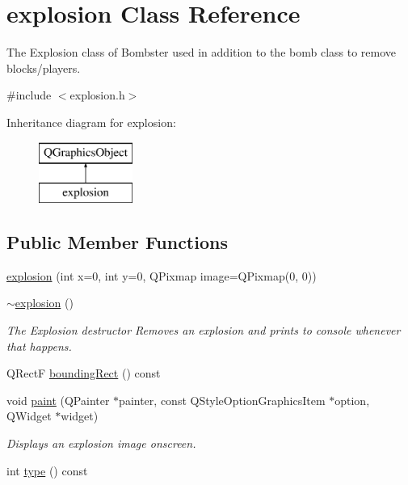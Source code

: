 \hypertarget{classexplosion}{\section{explosion Class Reference}
\label{classexplosion}
}


The Explosion class of Bombster used in addition to the bomb class to remove blocks/players.  




{\ttfamily \#include $<$explosion.\-h$>$}

Inheritance diagram for explosion\-:\begin{figure}[H]
\begin{center}
\leavevmode
\includegraphics[height=2.000000cm]{classexplosion}
\end{center}
\end{figure}
\subsection*{Public Member Functions}
\begin{DoxyCompactItemize}
\item 
\hyperlink{classexplosion_a792865d6d3230927b5a85c72c9867555}{explosion} (int x=0, int y=0, Q\-Pixmap image=Q\-Pixmap(0, 0))
\item 
\hyperlink{classexplosion_a3fc08d8c702d74ee3164825c975f8230}{$\sim$explosion} ()
\begin{DoxyCompactList}\small\item\em The Explosion destructor Removes an explosion and prints to console whenever that happens. \end{DoxyCompactList}\item 
Q\-Rect\-F \hyperlink{classexplosion_adc8680178e9e7d4e388d8850a2c03125}{bounding\-Rect} () const 
\item 
void \hyperlink{classexplosion_a401d7dbebfc4a92bcc408172df67c782}{paint} (Q\-Painter $\ast$painter, const Q\-Style\-Option\-Graphics\-Item $\ast$option, Q\-Widget $\ast$widget)
\begin{DoxyCompactList}\small\item\em Displays an explosion image onscreen. \end{DoxyCompactList}\item 
int \hyperlink{classexplosion_a1f660a5ee0c892cdd4edba1d00df87a7}{type} () const 
\end{DoxyCompactItemize}


